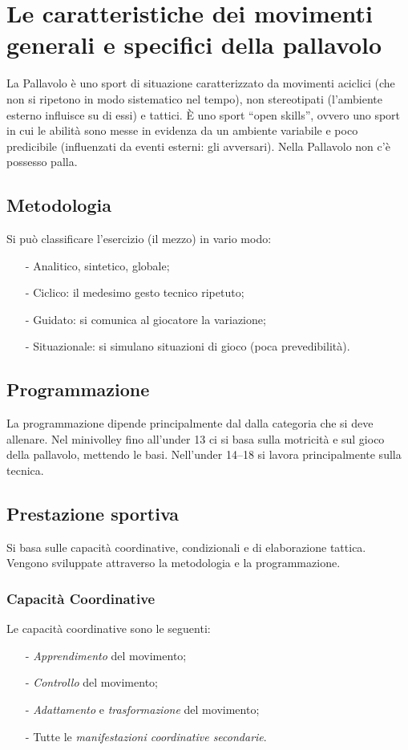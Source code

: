 \chapter{Le caratteristiche dei movimenti generali e specifici della pallavolo}

La Pallavolo è uno sport di situazione caratterizzato da movimenti aciclici (che non si ripetono in modo sistematico nel tempo), non stereotipati (l'ambiente esterno influisce su di essi) e tattici. \`E uno sport “open skills”, ovvero uno sport in cui le abilità sono messe in evidenza da un ambiente variabile e poco predicibile (influenzati da eventi esterni: gli avversari). Nella Pallavolo non c'è possesso palla.

\section{Metodologia}
Si può classificare l'esercizio (il mezzo) in vario modo:
\begin{itemize}
\item[-]Analitico, sintetico, globale;
\item[-]Ciclico: il medesimo gesto tecnico ripetuto;
\item[-]Guidato: si comunica al giocatore la variazione;
\item[-]Situazionale: si simulano situazioni di gioco (poca prevedibilità).
\end{itemize}


\section{Programmazione}
La programmazione dipende principalmente dal dalla categoria che si deve allenare. Nel minivolley fino all'under 13 ci si basa sulla motricità e sul gioco della pallavolo, mettendo le basi. Nell'under 14--18 si lavora principalmente sulla tecnica.

\section{Prestazione sportiva}
Si basa sulle capacità coordinative, condizionali e di elaborazione tattica. Vengono sviluppate attraverso la metodologia e la programmazione.

\subsection{Capacità Coordinative}
Le capacità coordinative sono le seguenti:
\begin{itemize}
\item[-]\emph{Apprendimento} del movimento;
\item[-]\emph{Controllo} del movimento;
\item[-]\emph{Adattamento} e \emph{trasformazione} del movimento;
\item[-]Tutte le \emph{manifestazioni coordinative secondarie}.
\end{itemize}


